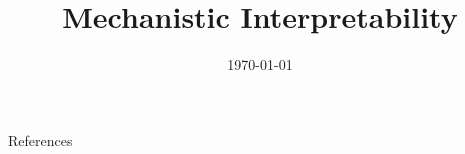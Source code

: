 \documentclass[aspectratio=169]{beamer}
\title{Mechanistic Interpretability}
\subtitle{\coursetitle}
\author{\instructor}
\date{\today}
\begin{document}
\begin{frame}
\titlepage
\end{frame}

\navoverview










\begin{frame}[allowframebreaks]{References}
\printbibliography[heading=none]
\end{frame}
\end{document}
